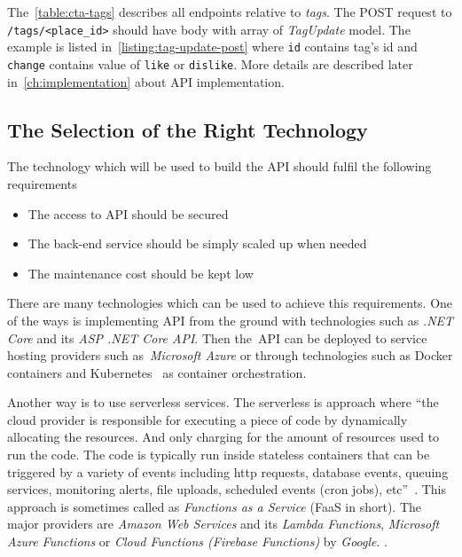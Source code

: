 The~\cref{table:cta-tags} describes all endpoints relative to \textit{tags}. The POST request to \verb|/tags/<place_id>| should have body with array of \textit{TagUpdate} model. The example is listed in~\cref{listing:tag-update-post} where \verb|id| contains tag's id and \verb|change| contains value of \verb|like| or \verb|dislike|. More details are described later in~\cref{ch:implementation} about API implementation.

\subsection{The Selection of the Right Technology}
The technology which will be used to build the API should fulfil the following requirements

\begin{itemize}
    \item The access to API should be secured
    \item The back-end service should be simply scaled up when needed
    \item The maintenance cost should be kept low
\end{itemize}

There are many technologies which can be used to achieve this requirements. One of the ways is implementing API from the ground with technologies such as \textit{.NET Core} and its \textit{ASP .NET Core API}. Then the~API can be deployed to service hosting providers such as~\textit{Microsoft Azure} or through technologies such as Docker containers and Kubernetes~\cite{kubernetes} as container orchestration. 

Another way is to use serverless services. The serverless is approach where ``the cloud provider is responsible for executing a piece of code by dynamically allocating the resources. And only charging for the amount of resources used to run the code. The code is typically run inside stateless containers that can be triggered by a variety of events including http requests, database events, queuing services, monitoring alerts, file uploads, scheduled events (cron jobs), etc''~\cite{what-is-serverless}. This approach is sometimes called as \textit{Functions as a Service} (FaaS in short). The major providers are \textit{Amazon Web Services} and its \textit{Lambda Functions}, \textit{Microsoft Azure Functions} or \textit{Cloud Functions (Firebase Functions)} by \textit{Google}. . 

